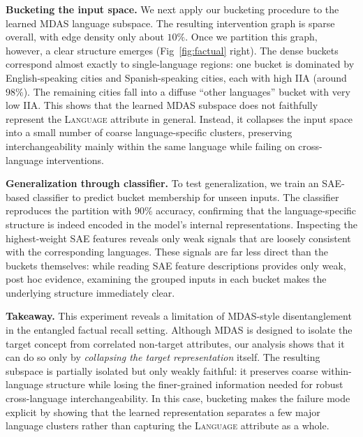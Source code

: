 \textbf{Bucketing the input space.}
We next apply our bucketing procedure to the learned MDAS language subspace. The resulting intervention  graph is sparse overall, with edge density only about \(10\%\). Once we partition this graph, however, a clear structure emerges (Fig~\ref{fig:factual} right). The dense buckets correspond almost exactly to single-language regions: one 
bucket is dominated by English-speaking cities and Spanish-speaking cities, each with high IIA (around \(98 \%\)). The remaining cities fall into a diffuse ``other languages'' bucket with very low IIA. This shows that the learned MDAS subspace does not faithfully represent the \textsc{Language} attribute in general. Instead, it collapses the input space into a small 
number of coarse language-specific clusters, preserving interchangeability mainly within the same language while failing on cross-language interventions. 

\textbf{Generalization through classifier.}
To test generalization, we train an SAE-based classifier to predict bucket membership for unseen inputs. The classifier reproduces the partition with $90\%$ accuracy, confirming that the language-specific structure is indeed encoded in the model's internal representations. Inspecting the highest-weight SAE features reveals only weak signals that are loosely consistent with the corresponding languages. These signals are far less direct than the buckets themselves: while reading SAE feature descriptions provides only weak, post hoc evidence, examining the grouped inputs in each bucket makes the underlying structure immediately clear.




\textbf{Takeaway.}
This experiment reveals a limitation of MDAS-style disentanglement in the entangled factual recall setting. Although MDAS is designed to isolate the target concept from correlated non-target attributes, our analysis shows that it can do so only by \emph{collapsing the target representation} itself. The resulting subspace is partially isolated but only weakly faithful: it preserves coarse within-language structure while losing the finer-grained information needed for robust cross-language interchangeability. In this case, bucketing makes the failure mode explicit by showing that the learned representation separates a few major language clusters rather than capturing the \textsc{Language} attribute as a whole.

